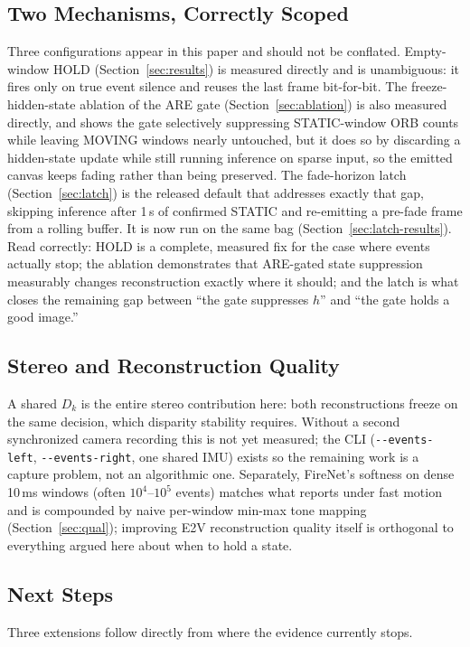 \documentclass[journal]{IEEEtran}
\begin{document}
\subsection{Two Mechanisms, Correctly Scoped}
\label{sec:scoped}
Three configurations appear in this paper and should not be conflated.
Empty-window HOLD (Section~\ref{sec:results}) is measured directly and is
unambiguous: it fires only on true event silence and reuses the last frame
bit-for-bit. The freeze-hidden-state ablation of the ARE gate
(Section~\ref{sec:ablation}) is also measured directly, and shows the gate
selectively suppressing STATIC-window ORB counts while leaving MOVING windows
nearly untouched, but it does so by discarding a hidden-state update while still
running inference on sparse input, so the emitted canvas keeps fading rather
than being preserved. The fade-horizon latch (Section~\ref{sec:latch}) is the
released default that addresses exactly that gap, skipping inference after 1\,s
of confirmed STATIC and re-emitting a pre-fade frame from a rolling buffer. It
is now run on the same bag (Section~\ref{sec:latch-results}). Read correctly:
HOLD is a complete, measured fix for the case where events actually stop; the
ablation demonstrates that ARE-gated state suppression measurably changes
reconstruction exactly where it should; and the latch is what closes the
remaining gap between ``the gate suppresses \(h\)'' and ``the gate holds a good
image.''

\subsection{Stereo and Reconstruction Quality}
A shared \(D_k\) is the entire stereo contribution here: both reconstructions
freeze on the same decision, which disparity stability requires. Without a
second synchronized camera recording this is not yet measured; the CLI
(\texttt{-{}-events-left}, \texttt{-{}-events-right}, one shared IMU) exists so
the remaining work is a capture problem, not an algorithmic one. Separately,
FireNet's softness on dense 10\,ms windows (often \(10^{4}\)--\(10^{5}\) events)
matches what \cite{scheerlinck2020} reports under fast motion and is compounded
by naive per-window min-max tone mapping (Section~\ref{sec:qual}); improving E2V
reconstruction quality itself is orthogonal to everything argued here about when
to hold a state.

\subsection{Next Steps}
\label{sec:next}
Three extensions follow directly from where the evidence currently stops.
\end{document}
